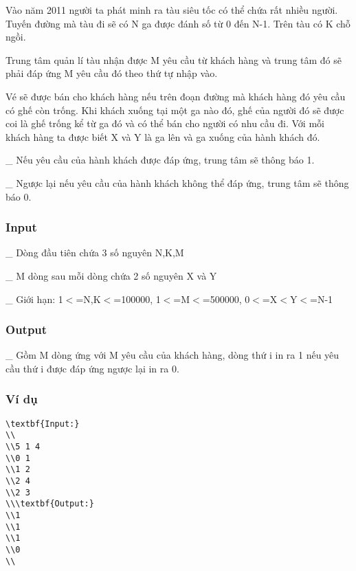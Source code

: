 



   Vào năm 2011 người ta phát minh ra tàu siêu tốc có thể chứa rất nhiều người. Tuyến đường mà tàu đi sẽ có N ga được đánh số từ 0 đến N-1. Trên tàu có K chỗ ngồi.  

   Trung tâm quản lí tàu nhận được M yêu cầu từ khách hàng và trung tâm đó sẽ phải đáp ứng M yêu cầu đó theo thứ tự nhập vào.  

   Vé sẽ được bán cho khách hàng nếu trên đoạn đường mà khách hàng đó yêu cầu có ghế còn trống. Khi khách xuống tại một ga nào đó, ghế của người đó sẽ được coi là ghế trống kể từ ga đó và có thể bán cho người có nhu cầu đi. Với mỗi khách hàng ta được biết X và Y là ga lên và ga xuống của hành khách đó.  

   \_ Nếu yêu cầu của hành khách được đáp ứng, trung tâm sẽ thông báo 1.  

   \_ Ngược lại nếu yêu cầu của hành khách không thể đáp ứng, trung tâm sẽ thông báo 0.  

\subsubsection{   Input  }

   \_ Dòng đầu tiên chứa 3 số nguyên N,K,M  

   \_ M dòng sau mỗi dòng chứa 2 số nguyên X và Y  

   \_ Giới hạn: 1$<$=N,K$<$=100000, 1$<$=M$<$=500000, 0$<$=X$<$Y$<$=N-1  

\subsubsection{   Output  }

   \_ Gồm M dòng ứng với M yêu cầu của khách hàng, dòng thứ i in ra 1 nếu yêu cầu thứ i được đáp ứng ngược lại in ra 0.  

\subsubsection{   Ví dụ  }
\begin{verbatim}
\textbf{Input:}
\\
\\5 1 4
\\0 1
\\1 2
\\2 4
\\2 3
\\\textbf{Output:}
\\1
\\1
\\1
\\0
\\\end{verbatim}
